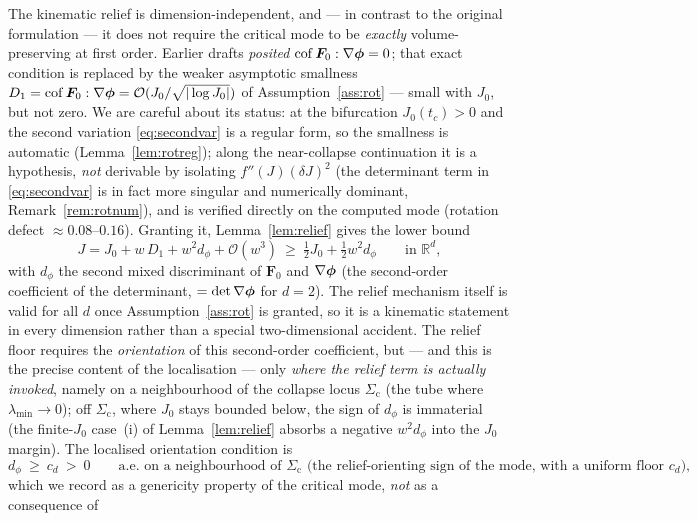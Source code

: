The kinematic relief is dimension-independent, and --- in contrast to the original formulation --- it does not require
the critical mode to be \emph{exactly} volume-preserving at first order. Earlier drafts \emph{posited}
$\operatorname{cof}\bm{F}_0:\nabla\bm{\phi}=0$; that exact condition is replaced by the weaker asymptotic smallness
$D_1=\operatorname{cof}\bm{F}_0:\nabla\bm{\phi}=\mathcal{O}(J_0/\sqrt{|\log J_0|})$ of Assumption~\ref{ass:rot} ---
small with $J_0$, but not zero. We are careful about its status: at the bifurcation $J_0(t_c)>0$ and the second
variation \eqref{eq:secondvar} is a regular form, so the smallness is automatic (Lemma~\ref{lem:rotreg}); along the
near-collapse continuation it is a hypothesis, \emph{not} derivable by isolating $f''(J)(\delta J)^2$ (the determinant
term in \eqref{eq:secondvar} is in fact more singular and numerically dominant, Remark~\ref{rem:rotnum}), and is
verified directly on the computed mode (rotation defect $\approx0.08$--$0.16$). Granting it, Lemma~\ref{lem:relief}
gives the lower bound
\begin{equation}
    \label{eq:reliefd}
    J=J_0+w\,D_1+w^2 d_\phi+\mathcal{O}(w^3) \ \ge\ \tfrac12 J_0+\tfrac12 w^2 d_\phi
    \qquad\text{in } \mathbb{R}^d,
\end{equation}
with $d_\phi$ the second mixed discriminant of $\bm{F}_0$ and $\nabla\bm{\phi}$ (the second-order coefficient of the
determinant, $=\det\nabla\bm{\phi}$ for $d=2$). The relief mechanism itself is valid for all $d$ once
Assumption~\ref{ass:rot} is granted, so it is a kinematic statement in every dimension rather than a special
two-dimensional accident. The relief floor requires the \emph{orientation} of this second-order coefficient, but --- and this is the precise
content of the localisation --- only \emph{where the relief term is actually invoked}, namely on a neighbourhood of the
collapse locus $\Sigma_{\mathrm{c}}$ (the tube where $\lambda_{\min}\to0$); off $\Sigma_{\mathrm{c}}$, where $J_0$ stays
bounded below, the sign of $d_\phi$ is immaterial (the finite-$J_0$ case~(i) of Lemma~\ref{lem:relief} absorbs a negative
$w^2 d_\phi$ into the $J_0$ margin). The localised orientation condition is
\begin{equation}
    \label{eq:dphisign}
    d_\phi\ \ge\ c_d\ >\ 0 \qquad\text{a.e.\ on a neighbourhood of $\Sigma_{\mathrm{c}}$ (the relief-orienting sign of the mode, with a uniform floor $c_d$),}
\end{equation}
which we record as a genericity property of the critical mode, \emph{not} as a consequence of
